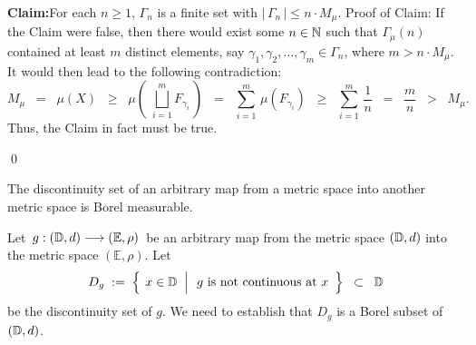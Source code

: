 	\begin{center}
	\begin{minipage}{6.5in}
	\vskip 0.1cm
	\noindent
	\textbf{Claim:}\;\;For each $n \geq 1$, $\Gamma_{n}$ is a finite set with $\left\vert\,\Gamma_{n}\,\right\vert \leq n\cdot M_{\mu}$.
	\vskip 0.2cm
	\noindent
	Proof of Claim:\quad
	If the Claim were false, then there would exist some $n \in \mathbb{N}$ such that $\Gamma_{\mu}(n)$
	contained at least $m$ distinct elements,
	say $\gamma_{1}, \gamma_{2}, \ldots, \gamma_{m} \in \Gamma_{n}$,
	where $m > n\cdot M_{\mu}$.
	It would then lead to the following contradiction:
	\begin{equation*}
	M_{\mu}\;\;=\;\;\mu(X)
	\;\;\geq\;\;\mu\!\left(\;\bigsqcup_{i=1}^{m} F_{\gamma_{i}}\,\right)
	\;\;=\;\; \sum_{i=1}^{m}\,\mu\!\left(F_{\gamma_{i}}\right)
	\;\;\geq\;\; \sum_{i=1}^{m}\,\dfrac{1}{n}
	\;\;=\;\;\dfrac{m}{n}
	\;\;>\;\; M_{\mu}.
	\end{equation*}
	Thus, the Claim in fact must be true.
	\end{minipage}
	\end{center}
\qed


\begin{proposition}\label{DiscontinuitySetsInMetricSpacesAreBorel}
\mbox{} \vskip 0.1cm \noindent
The discontinuity set of an arbitrary map from a metric space into another metric space is Borel measurable.
\end{proposition}
\proof
Let \,$g : (\mathbb{D},d) \longrightarrow (\mathbb{E},\rho)$\, be an arbitrary map from
the metric space $(\mathbb{D},d)$ into the metric space $(\mathbb{E},\rho)$.
Let
\begin{equation*}
D_{g}
\; := \;
	\left\{\;\left.
		x\overset{{\color{white}.}}{\in}\D
		\;\;\right\vert
		\begin{array}{c}\textnormal{$g$ is not continuous at $x$}\end{array}
		\right\}
\;\;\subset\;\; \D
\end{equation*}
be the discontinuity set of $g$.
We need to establish that $D_{g}$ is a Borel subset of $(\mathbb{D},d)$.

